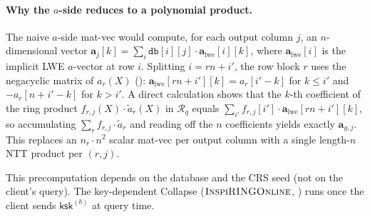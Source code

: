 \documentclass[11pt,a4paper]{article}
\newcommand{\R}{\mathcal{R}}
\newcommand{\Rq}{\R_{q}}
\begin{document}
\paragraph{Why the $a$-side reduces to a polynomial product.}
The naive $a$-side mat-vec would compute, for each output column $j$, an $n$-dimensional vector $\mathbf{a}_j[k] = \sum_i \texttt{db}[i][j] \cdot \mathbf{a}_{\mathrm{lwe}}[i][k]$, where $\mathbf{a}_{\mathrm{lwe}}[i]$ is the implicit LWE $a$-vector at row $i$.
Splitting $i = rn + i'$, the row block $r$ uses the negacyclic matrix of $a_r(X)$ (): $\mathbf{a}_{\mathrm{lwe}}[rn{+}i'][k] = a_r[i'{-}k]$ for $k \le i'$ and $-a_r[n{+}i'{-}k]$ for $k > i'$.
A direct calculation shows that the $k$-th coefficient of the ring product $f_{r,j}(X) \cdot \tilde{a}_r(X)$ in $\Rq$ equals $\sum_{i'} f_{r,j}[i'] \cdot \mathbf{a}_{\mathrm{lwe}}[rn{+}i'][k]$, so accumulating $\sum_r f_{r,j} \cdot \tilde{a}_r$ and reading off the $n$ coefficients yields exactly $\mathbf{a}_{g,j}$.
This replaces an $n_r \cdot n^2$ scalar mat-vec per output column with a single length-$n$ NTT product per $(r,j)$.

This precomputation depends on the database and the CRS seed (not on the client's query).
The key-dependent Collapse ($\textsc{InspiRINGOnline}$, ) runs once the client sends $\mathsf{ksk}^{(b)}$ at query time.
\end{document}
